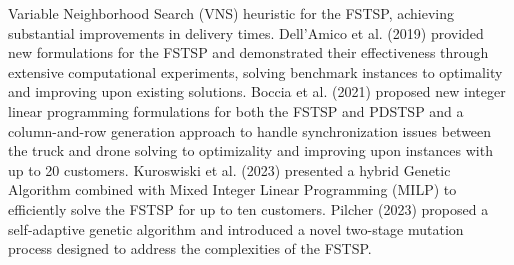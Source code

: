 \documentclass{article}
\begin{document}
	
	Variable Neighborhood Search (VNS) heuristic for the FSTSP, achieving substantial improvements in delivery times. Dell’Amico et al. (2019) provided new formulations for the FSTSP and demonstrated their effectiveness through extensive computational experiments, solving benchmark instances to optimality and improving upon existing solutions. Boccia et al. (2021) proposed  new integer linear programming formulations for both the FSTSP and PDSTSP and a column-and-row generation approach to handle synchronization issues between the truck and drone solving to optimizality and improving upon instances with up to 20 customers. Kuroswiski et al. (2023) presented a hybrid Genetic Algorithm combined with Mixed Integer Linear Programming (MILP) to efficiently solve the FSTSP for up to ten customers. Pilcher (2023) proposed a self-adaptive genetic algorithm and introduced a novel two-stage mutation process designed to address the complexities of the FSTSP.
	
	
\end{document}
